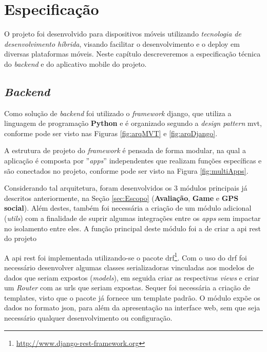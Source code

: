 \chapter{Especificação}\label{chp:Especificação}
O projeto foi desenvolvido para dispositivos móveis utilizando \textit{tecnologia de desenvolvimento híbrida}, visando facilitar o desenvolvimento e o deploy em diversas plataformas móveis. Neste capítulo descreveremos a especificação técnica do \textit{backend} e do aplicativo mobile do projeto.

\section{\textit{Backend}}\label{sec:spec-backend}
Como solução de \textit{backend} foi utilizado o \textit{framework} \gls{django}, que utiliza a linguagem de programação \textbf{Python} e é organizado segundo a \textit{design pattern} \gls{mvt}, conforme pode ser visto nas Figuras \ref{fig:arqMVT} e \ref{fig:arqDjango}.%
%
%
%

A estrutura de projeto do \textit{framework} é pensada de forma modular, na qual a aplicação é composta por ''\textit{apps}'' independentes que realizam funções específicas e são conectados no projeto, conforme pode ser visto na Figura \ref{fig:multiApps}.%
%

Considerando tal arquitetura, foram desenvolvidos os 3 módulos principais já descritos anteriormente, na Seção \ref{sec:Escopo} (\textbf{Avaliação}, \textbf{Game} e \textbf{GPS social}). Além destes, também foi necessária a criação de um módulo adicional (\textit{utils}) com a finalidade de suprir algumas integrações entre os \textit{apps} sem impactar no isolamento entre eles. A função principal deste módulo foi a de criar a \gls{api} \gls{rest} do projeto

A \gls{api} \gls{rest} foi implementada utilizando-se o pacote \gls{drf}\footnote{\url{http://www.django-rest-framework.org}}. Com o uso do \gls{drf} foi necessário desenvolver algumas classes serializadoras vinculadas aos modelos de dados que seriam expostos (\textit{models}), em seguida criar as respectivas \textit{views} e criar um \textit{Router} com as urls que seriam expostas. Sequer foi necessária a criação de templates, visto que o pacote já fornece um template padrão. O módulo expõe os dados no formato \gls{json}, para além da apresentação na interface web, sem que seja necessário qualquer desenvolvimento ou configuração.

